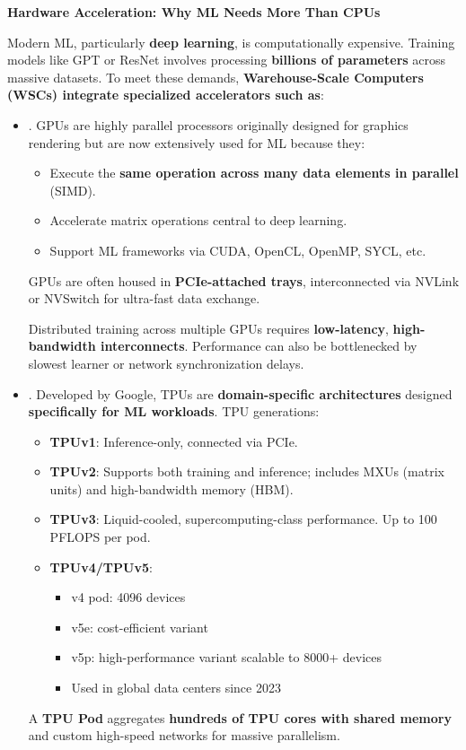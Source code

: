 \highspace
\begin{flushleft}
    \textcolor{Red2}{ \textbf{Hardware Acceleration: Why ML Needs More Than CPUs}}
\end{flushleft}
Modern ML, particularly \textbf{deep learning}, is computationally expensive. Training models like GPT or ResNet involves processing \textbf{billions of parameters} across massive datasets. To meet these demands, \textbf{Warehouse-Scale Computers (WSCs) integrate specialized accelerators such as}:
\begin{itemize}
    \item {}. GPUs are highly parallel processors originally designed for graphics rendering but are now extensively used for ML because they:
    \begin{itemize}
        \item Execute the \textbf{same operation across many data elements in parallel} (SIMD).
        \item Accelerate matrix operations central to deep learning.
        \item Support ML frameworks via CUDA, OpenCL, OpenMP, SYCL, etc.
    \end{itemize}
    GPUs are often housed in \textbf{PCIe-attached trays}, interconnected via NVLink or NVSwitch for ultra-fast data exchange.
    
    Distributed training across multiple GPUs requires \textbf{low-latency}, \textbf{high-bandwidth interconnects}. Performance can also be bottlenecked by slowest learner or network synchronization delays. 


    \item {}. Developed by Google, TPUs are \textbf{domain-specific architectures} designed \textbf{specifically for ML workloads}. TPU generations:
    \begin{itemize}
        \item \textbf{TPUv1}: Inference-only, connected via PCIe.
        \item \textbf{TPUv2}: Supports both training and inference; includes MXUs (matrix units) and high-bandwidth memory (HBM).
        \item \textbf{TPUv3}: Liquid-cooled, supercomputing-class performance. Up to 100 PFLOPS per pod.
        \item \textbf{TPUv4/TPUv5}:
        \begin{itemize}
            \item v4 pod: 4096 devices
            \item v5e: cost-efficient variant
            \item v5p: high-performance variant scalable to 8000+ devices
            \item Used in global data centers since 2023
        \end{itemize}
    \end{itemize}
    A \textbf{TPU Pod} aggregates \textbf{hundreds of TPU cores with shared memory} and custom high-speed networks for massive parallelism.


\end{itemize}
